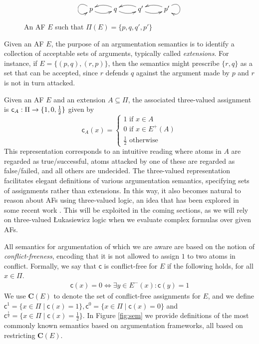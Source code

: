 \documentclass[greybox]{svmult}
\newcommand{\outa}[2]{#1^+(#2)}
\newcommand{\proto}{\mathbf C}
\newcommand{\clab}{\mathsf c}
\begin{document}
\begin{figure}
$$
\xymatrix{p \ar@(lu,ld) \ar@/_/[r] & q \ar@/_/[l] \ar@/_/[r] & q' \ar@/_/[l] \ar@/_/[r] & p' \ar@(ru,rd) \ar@/_/[l] }
$$
\caption{An AF $E$ such that $\Pi(E) = \{p,q,q',p'\}$}
\label{fig:1}
\end{figure}

Given an AF $E$, the purpose of an argumentation semantics is to identify a 
collection of acceptable sets of arguments, typically called \emph{extensions}. For instance, if $E = \{(p,q),(r,p)\}$, then the semantics might prescribe $\{r,q\}$ as a set that can be accepted, since $r$ defends $q$ against the argument made by $p$ and $r$ is not in turn attacked. 

Given an AF $E$ and an extension $A \subseteq \Pi$, the associated three-valued assignment is $\clab_A:\Pi \to \three$ given by
$$
\clab_A(x) = \begin{cases} 1 \text{ if } x \in A \\ 0 \text{ if } x \in \outa E A \\ \frac{1}{2} \text{ otherwise } \end{cases}
$$
This representation corresponds to an intuitive reading where atoms in $A$ are regarded as true/successful, atoms attacked by one of these are regarded as false/failed, and all others are undecided. The three-valued representation facilitates elegant definitions of various argumentation semantics, specifying sets of assignments rather than extensions. In this way, it also becomes natural to reason about AFs using three-valued logic, an idea that has been explored in some recent work \cite{dyrkolbotn,arieli,dyrkolbotn1}. This will be exploited in the coming sections, as we will rely on three-valued {\L}ukasiewicz logic when we evaluate complex formulas over given AFs.

All semantics for argumentation of which we are aware are based on the notion of \emph{conflict-freeness}, encoding that it is not allowed to assign $1$ to two atoms in conflict. Formally, we say that $\clab$ is conflict-free for $E$ if the following holds, for all $x \in \Pi$.
\begin{equation}\label{eq:cam}
\begin{array}{l}
\clab(x) = 0 \iff \exists y \in E^-(x): \clab(y) = 1
\end{array}
\end{equation}
We use $\proto(E)$ to denote the set of conflict-free assignments for $E$, and we define $\clab^1 = \{x \in \Pi \mid \clab(x) = 1\}, \clab^0 = \{x \in \Pi \mid \clab(x) = 0\}$ and $\clab^{\frac{1}{2}} = \{x \in \Pi \mid \clab(x) = \frac{1}{2}\}$. In Figure \ref{fig:sem} we provide definitions of the most commonly known semantics based on argumentation frameworks, all based on restricting $\proto(E)$. 
\end{document}

